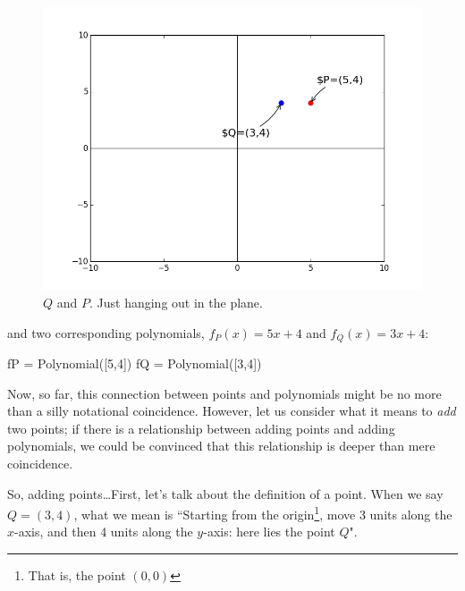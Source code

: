 \begin{figure}[t]
	\centering
	\includegraphics[scale=0.25]{BookSource/Chapters/p_and_q_hanging_out.jpg}
	\caption{$Q$ and $P$. Just hanging out in the plane.}
	\label{fig:p_and_q_hanging_out}
\end{figure}
and two corresponding polynomials, $f_P(x) = 5x + 4$ and $f_Q(x) = 3x + 4$:

\begin{python}
	fP = Polynomial([5,4])
	fQ = Polynomial([3,4])
\end{python}

Now, so far, this connection between points and polynomials might be no more than a silly notational coincidence. However, let us consider what it means to \emph{add} two points; if there is a relationship between adding points and adding polynomials, we could be convinced that this relationship is deeper than mere coincidence.

So, adding points\ldots First, let's talk about the definition of a point. When we say $Q = (3,4)$, what we mean is ``Starting from the origin\footnote{That is, the point $(0,0)$}, move 3 units along the $x$-axis, and then 4 units along the $y$-axis: here lies the point $Q$". 


